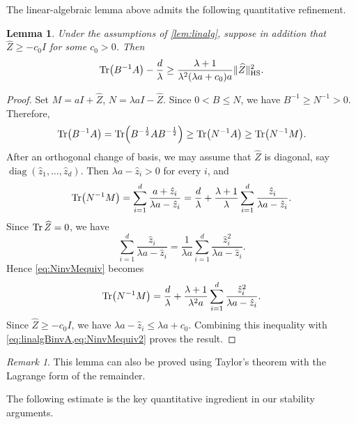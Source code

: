 \documentclass{amsart}
\numberwithin{equation}{section}
\theoremstyle{plain}
\newtheorem{lemma}[theorem]{Lemma}
\theoremstyle{definition}
\theoremstyle{plain}
\theoremstyle{remark}
\newtheorem{remark}[theorem]{Remark}
\numberwithin{figure}{section}
\DeclareMathOperator{\diag}{diag}
\begin{document}
The linear-algebraic lemma above admits the following quantitative refinement.
\begin{lemma}
    \label{lem:linalg2}
    Under the assumptions of \cref{lem:linalg}, suppose in addition that
    $\widehat{Z}\geq-c_0I$ for some $c_0>0$. Then
    \begin{equation*}
        \Tr(B^{-1}A) - \frac{d}{\lambda} \geq \frac{\lambda+1}{\lambda^2(\lambda a+c_0)a} \|\widehat{Z}\|_{\text{HS}}^2.
    \end{equation*}
\end{lemma}

\begin{proof}
    Set $M=aI+\widehat{Z}$, $N=\lambda aI-\widehat{Z}$. Since $0< B\leq N$, we have $B^{-1}\geq N^{-1}>0$. Therefore,
    \begin{equation}
        \label{eq:linalgBinvA}
        \Tr(B^{-1}A) = \Tr(B^{-\frac{1}{2}}AB^{-\frac{1}{2}})\geq \Tr(N^{-1}A)\geq \Tr(N^{-1}M).
    \end{equation}
    After an orthogonal change of basis, we may assume that $\widehat{Z}$ is diagonal, say $\diag(\hat{z}_1,\dots,\hat{z}_d)$. Then $\lambda a-\hat{z}_i>0$ for every $i$, and
    \begin{equation}
        \label{eq:NinvMequiv}
        \Tr(N^{-1}M) = \sum_{i=1}^d \frac{a+\hat{z}_i}{\lambda a-\hat{z}_i} = \frac{d}{\lambda}+ \frac{\lambda+1}{\lambda}\sum_{i=1}^{d}\frac{\hat{z}_i}{\lambda a-\hat{z}_i}.
    \end{equation}
    Since $\Tr \widehat{Z}=0$, we have
    \[
        \sum_{i=1}^d \frac{\hat{z}_i}{\lambda a-\hat{z}_i} = \frac{1}{\lambda a} \sum_{i=1}^d \frac{\hat{z}_i^2}{\lambda a-\hat{z}_i}.
    \]
    Hence \cref{eq:NinvMequiv} becomes
    \begin{equation}
        \label{eq:NinvMequiv2}
        \Tr(N^{-1}M) = \frac{d}{\lambda}+ \frac{\lambda+1}{\lambda^2 a}\sum_{i=1}^{d}\frac{\hat{z}_i^2}{\lambda a-\hat{z}_i}.
    \end{equation}
    Since $\widehat{Z}\geq-c_0I$, we have $\lambda a-\hat{z}_i\leq\lambda a+c_0$. Combining this inequality with \cref{eq:linalgBinvA,eq:NinvMequiv2} proves the result.
\end{proof}

\begin{remark}
    This lemma can also be proved using Taylor's theorem with the Lagrange form of the remainder.
\end{remark}

The following estimate is the key quantitative ingredient in our stability arguments.
\end{document}
